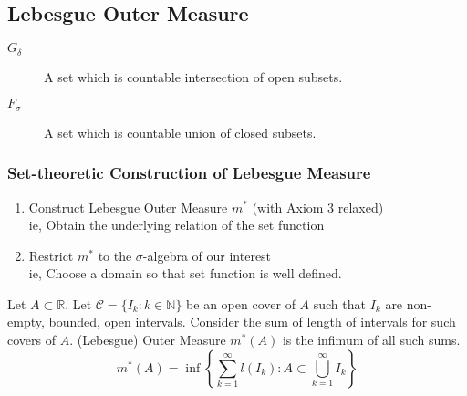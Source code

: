 \subsection{Lebesgue Outer Measure}
\begin{description}
	\item[$G_\delta$] A set which is countable intersection of open subsets.
	\item[$F_\sigma$] A set which is countable union of closed subsets.
\end{description}

\subsubsection{Set-theoretic Construction of Lebesgue Measure}
\begin{enumerate}
	\item Construct Lebesgue Outer Measure $m^\ast$ (with Axiom 3 relaxed) \\
		ie, Obtain the underlying relation of the set function
	\item Restrict $m^\ast$ to the $\sigma$-algebra of our interest \\
		ie, Choose a domain so that set function is well defined.
\end{enumerate}
\begin{definition}
	Let $A \subset \mathbb{R}$.
	Let $\mathcal{C} = \{ I_k : k \in \mathbb{N}\}$ be an open cover of $A$ such that $I_k$ are non-empty, bounded, open intervals.
	Consider the sum of length of intervals for such covers of $A$.
	(Lebesgue) Outer Measure $m^\ast(A)$ is the infimum of all such sums.
\begin{equation}
	 m^\ast(A) = \inf \left\{ \sum_{k=1}^\infty l(I_k) : A \subset \bigcup_{k=1}^\infty I_k \right\} 
	 \label{eq:outermeasure}
\end{equation}
\end{definition}
